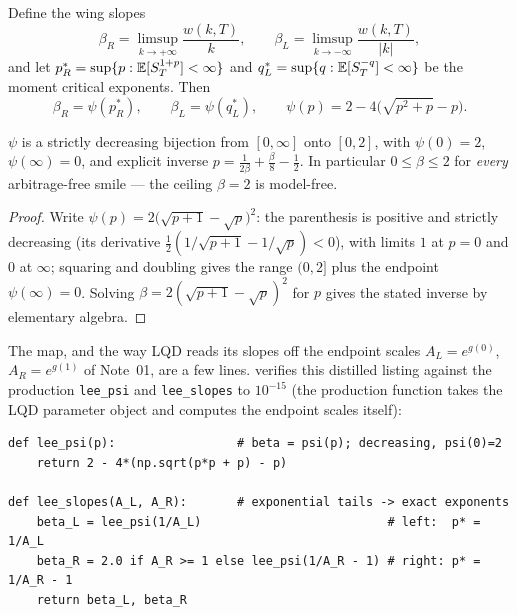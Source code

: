 \documentclass[11pt]{article}
\begin{document}
\begin{theorem}
\label{thm:lee}
Define the wing slopes
\[
\beta_R=\limsup_{k\to+\infty}\frac{w(k,T)}{k},\qquad
\beta_L=\limsup_{k\to-\infty}\frac{w(k,T)}{|k|},
\]
and let $p_R^*=\sup\{p:\mathbb{E}[S_T^{1+p}]<\infty\}$ and
$q_L^*=\sup\{q:\mathbb{E}[S_T^{-q}]<\infty\}$ be the moment critical exponents. Then
\begin{equation}
\beta_R=\psi(p_R^*),\qquad \beta_L=\psi(q_L^*),\qquad
\psi(p)=2-4\big(\sqrt{p^2+p}-p\big).
\label{eq:psi}
\end{equation}
\end{theorem}

\begin{lemma}
\label{lem:psi}
$\psi$ is a strictly decreasing bijection from $[0,\infty]$ onto $[0,2]$,
with $\psi(0)=2$, $\psi(\infty)=0$, and explicit inverse
$p=\tfrac{1}{2\beta}+\tfrac{\beta}{8}-\tfrac12$. In particular $0\le\beta\le2$
for \emph{every} arbitrage-free smile --- the ceiling $\beta=2$ is model-free.
\end{lemma}

\begin{proof}
Write $\psi(p)=2\big(\sqrt{p+1}-\sqrt p\big)^2$: the parenthesis is positive
and strictly decreasing (its derivative
$\tfrac12(1/\sqrt{p+1}-1/\sqrt p)<0$), with limits $1$ at $p=0$ and $0$ at
$\infty$; squaring and doubling gives the range $(0,2]$ plus the endpoint
$\psi(\infty)=0$. Solving $\beta=2(\sqrt{p+1}-\sqrt p)^2$ for $p$ gives the
stated inverse by elementary algebra.
\end{proof}

The map, and the way LQD reads its slopes off the endpoint scales
$A_L=e^{g(0)}$, $A_R=e^{g(1)}$ of Note~01, are a few lines. 
verifies this distilled listing against the production \texttt{lee\_psi}
and \texttt{lee\_slopes} to $10^{-15}$ (the production function takes the
LQD parameter object and computes the endpoint scales itself):

\begin{lstlisting}[caption={Lee's $\psi$ and the LQD structural wing slopes
(distilled from \texttt{models/lqd/basis.py}).},label={lst:lee}]
def lee_psi(p):                 # beta = psi(p); decreasing, psi(0)=2
    return 2 - 4*(np.sqrt(p*p + p) - p)

def lee_slopes(A_L, A_R):       # exponential tails -> exact exponents
    beta_L = lee_psi(1/A_L)                          # left:  p* = 1/A_L
    beta_R = 2.0 if A_R >= 1 else lee_psi(1/A_R - 1) # right: p* = 1/A_R - 1
    return beta_L, beta_R
\end{lstlisting}
\end{document}
